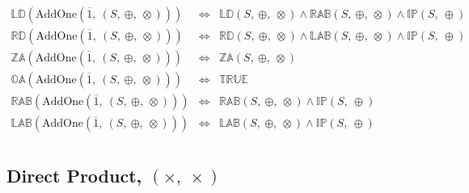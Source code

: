 \documentclass[10pt]{article}
\newcommand{\propname}[1]{{\mathbb{#1}}}
\begin{document}
\[
\begin{array}{rcl} 
\propname{LD}(\mathrm{AddOne}(\overline{1},\ (S,\ \oplus,\ \otimes))) 
    & \Leftrightarrow %
    & \propname{LD}(S,\ \oplus,\ \otimes) 
      \wedge \propname{RAB}(S,\ \oplus,\ \otimes) 
      \wedge  \propname{IP}(S,\ \oplus) 
    \\
\propname{RD}(\mathrm{AddOne}(\overline{1},\ (S,\ \oplus,\ \otimes))) 
    & \Leftrightarrow %
    & \propname{RD}(S,\ \oplus,\ \otimes) 
      \wedge\propname{LAB}(S,\ \oplus,\ \otimes) 
      \wedge\propname{IP}(S,\ \oplus) 
    \\
\propname{ZA}(\mathrm{AddOne}(\overline{1},\ (S,\ \oplus,\ \otimes))) 
    & \Leftrightarrow %
    & \propname{ZA}(S,\ \oplus,\ \otimes) \\
\propname{OA}(\mathrm{AddOne}(\overline{1},\ (S,\ \oplus,\ \otimes))) 
    & \Leftrightarrow %
    & \propname{TRUE}\\ 
\propname{RAB}(\mathrm{AddOne}(\overline{1},\ (S,\ \oplus,\ \otimes))) 
    & \Leftrightarrow %
    & \propname{RAB}(S,\ \oplus,\ \otimes) 
      \wedge \propname{IP}(S,\ \oplus) \\ 
\propname{LAB}(\mathrm{AddOne}(\overline{1},\ (S,\ \oplus,\ \otimes))) 
    & \Leftrightarrow %
    & \propname{LAB}(S,\ \oplus,\ \otimes)
      \wedge \propname{IP}(S,\ \oplus) 
\\ 
\end{array} 
\] 

\subsection{Direct Product, $(\times,\ \times)$} 
\end{document}
